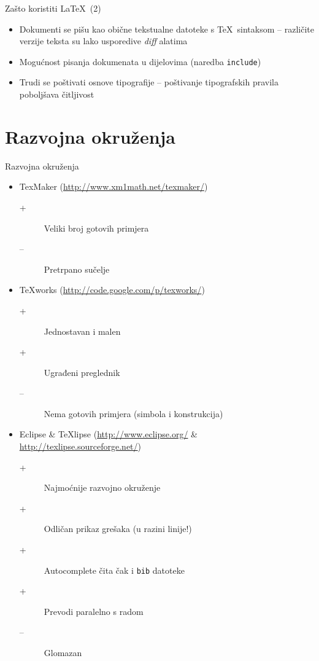 \documentclass{beamer}
\begin{document}
\begin{frame}[t]{Zašto koristiti \LaTeX\ (2)}
\begin{itemize}
  \item Dokumenti se pišu kao obične tekstualne datoteke s \TeX\ sintaksom --
  različite verzije teksta su lako usporedive \emph{diff} alatima %
  \item Mogućnost pisanja dokumenata u dijelovima (naredba \texttt{include})
  \item Trudi se poštivati osnove tipografije -- poštivanje tipografskih pravila poboljšava čitljivost  
\end{itemize}
\end{frame}

\section{Razvojna okruženja}
\begin{frame}[t]{Razvojna okruženja}
\begin{itemize}
\item TexMaker (\url{http://www.xm1math.net/texmaker/})
\begin{description}
  \item[+] Veliki broj gotovih primjera %
  \item[--] Pretrpano sučelje
\end{description}
\pause
\item \TeX{}works (\url{http://code.google.com/p/texworks/})
\begin{description}
  \item[+] Jednostavan i malen
  \item[+] Ugrađeni preglednik
  \item[--] Nema gotovih primjera (simbola i konstrukcija)
\end{description}
\pause
\item Eclipse \& \TeX{}lipse (\url{http://www.eclipse.org/} \& \url{http://texlipse.sourceforge.net/})
\begin{description}
  \item[+] Najmoćnije razvojno okruženje
  \item[+] Odličan prikaz grešaka (u razini linije!)
  \item[+] Autocomplete čita čak i \texttt{bib} datoteke
  \item[+] Prevodi paralelno s radom
  \item[--] Glomazan
\end{description} 
\end{itemize}
\end{frame}
\end{document}
